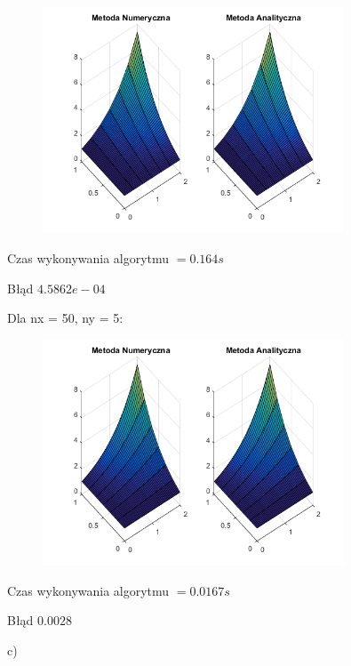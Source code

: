 \begin{figure}[!ht]
	\begin{center}
		\includegraphics[width=0.8\textwidth]{Lab5/charts/zad2/5x50.png}
	\end{center}
\end{figure}

Czas wykonywania algorytmu $ = 0.164 s$

Błąd $4.5862e-04$

Dla nx = 50, ny = 5:

\begin{figure}[!ht]
	\begin{center}
		\includegraphics[width=0.8\textwidth]{Lab5/charts/zad2/50x5.png}
	\end{center}
\end{figure}

Czas wykonywania algorytmu $ = 0.0167 s$

Błąd $0.0028$

\newpage

c)

